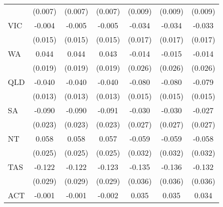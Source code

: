{\begin{tabular}{l*{6}{c}}
                    &     (0.007)         &     (0.007)         &     (0.007)         &     (0.009)         &     (0.009)         &     (0.009)         \\
VIC                 &      -0.004         &      -0.005         &      -0.005         &      -0.034\sym{**} &      -0.034\sym{**} &      -0.033\sym{**} \\
                    &     (0.015)         &     (0.015)         &     (0.015)         &     (0.017)         &     (0.017)         &     (0.017)         \\
WA                  &       0.044\sym{**} &       0.044\sym{**} &       0.043\sym{**} &      -0.014         &      -0.015         &      -0.014         \\
                    &     (0.019)         &     (0.019)         &     (0.019)         &     (0.026)         &     (0.026)         &     (0.026)         \\
QLD                 &      -0.040\sym{***}&      -0.040\sym{***}&      -0.040\sym{***}&      -0.080\sym{***}&      -0.080\sym{***}&      -0.079\sym{***}\\
                    &     (0.013)         &     (0.013)         &     (0.013)         &     (0.015)         &     (0.015)         &     (0.015)         \\
SA                  &      -0.090\sym{***}&      -0.090\sym{***}&      -0.091\sym{***}&      -0.030         &      -0.030         &      -0.027         \\
                    &     (0.023)         &     (0.023)         &     (0.023)         &     (0.027)         &     (0.027)         &     (0.027)         \\
NT                  &       0.058\sym{**} &       0.058\sym{**} &       0.057\sym{**} &      -0.059\sym{*}  &      -0.059\sym{*}  &      -0.058\sym{*}  \\
                    &     (0.025)         &     (0.025)         &     (0.025)         &     (0.032)         &     (0.032)         &     (0.032)         \\
TAS                 &      -0.122\sym{***}&      -0.122\sym{***}&      -0.123\sym{***}&      -0.135\sym{***}&      -0.136\sym{***}&      -0.132\sym{***}\\
                    &     (0.029)         &     (0.029)         &     (0.029)         &     (0.036)         &     (0.036)         &     (0.036)         \\
ACT                 &      -0.001         &      -0.001         &      -0.002         &       0.035         &       0.035         &       0.034         \\

\end{tabular}}
